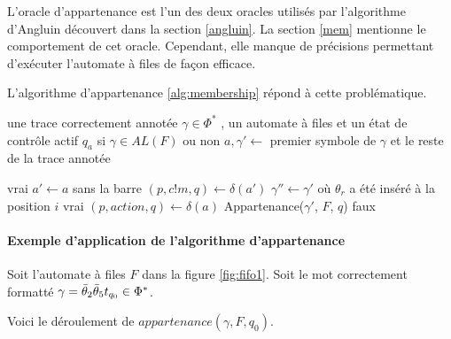 L'oracle d'appartenance est l'un des deux oracles utilisés par l'algorithme d'Angluin découvert dans la section \ref{angluin}. La section \ref{mem} mentionne le comportement de cet oracle. Cependant, elle manque de précisions permettant d'exécuter l'automate à files de façon efficace.

L'algorithme d'appartenance \ref{alg:membership} répond à cette problématique.

\begin{algo}[Appartenance]\label{alg:membership}
  \begin{algorithmic}[1]
    \REQUIRE une trace correctement annotée $\gamma\in\Phi^*$ , un automate à files \fifo et un état de contrôle actif $q_a$
    \ENSURE si $\gamma\in AL(F)$ ou non
    \STATE $a,\gamma'\leftarrow$ premier symbole de $\gamma$ et le reste de la trace annotée

        \RETURN vrai
      \ENDIF
      \STATE $a'\leftarrow a$ sans la barre
      \STATE $(p, c!m, q)\leftarrow\delta(a')$ 
            \STATE $\gamma''\leftarrow\gamma'$ où $\theta_r$ a été inséré à la position $i$
              \RETURN vrai
            \ENDIF
          \ENDFOR
        \ENDFOR
      \ENDIF
    \ELSE
      \STATE $(p,action,q)\leftarrow\delta(a)$ 
        \RETURN Appartenance($\gamma'$, $F$, $q$)
      \ENDIF
    \ENDIF
    \RETURN faux
  \end{algorithmic}
\end{algo}

\paragraph{Exemple d'application de l'algorithme d'appartenance}

Soit l'automate à files $F$ dans la figure \ref{fig:fifo1}.
Soit le mot correctement formatté $\gamma=\bar{\theta}_2\bar{\theta}_5 t_{q_0} \in \Phi^*$.

Voici le déroulement de $appartenance(\gamma, F, q_0)$.

